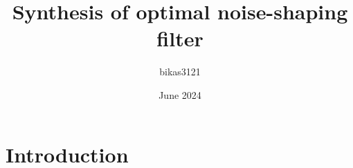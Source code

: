 \documentclass{article}
\title{Synthesis of optimal noise-shaping filter}
\author{bikas3121 }
\date{June 2024}
\begin{document}
\maketitle

\section{Introduction}
\end{document}
